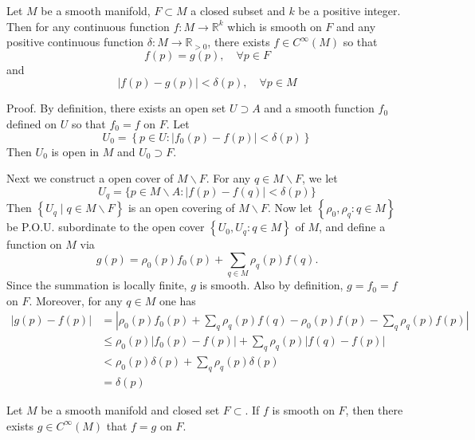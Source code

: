 \documentclass[12pt, oneside]{book}
\begin{document}
\begin{theorem}
    Let $M$ be a smooth manifold, $F \subset M$ a closed subset and $k$ be a positive integer.
    Then for any continuous function $f: M \rightarrow \mathbb{R}^k$ which is smooth on $F$ and any positive continuous function $\delta: M \rightarrow \mathbb{R}_{>0}$, there exists $f \in C^{\infty}(M)$ so that
    \begin{equation*}
        f(p)=g(p), \quad \forall p \in F
    \end{equation*}
    and
    \begin{equation*}
        |f(p)-g(p)|<\delta(p), \quad \forall p \in M
    \end{equation*}

    Proof.
    By definition, there exists an open set $U \supset A$ and a smooth function $f_0$ defined on $U$ so that $f_0=f$ on $F$. Let
    \begin{equation*}
        U_0
        =
        \left\{p \in U:\left|f_0(p)-f(p)\right|<\delta(p)\right\}
    \end{equation*}
    Then $U_0$ is open in $M$ and $U_0 \supset F$.


    Next we construct a open cover of $M \backslash F$.
    For any $q \in M \backslash F$, we let
    \begin{equation*}
        U_q
        =
        \{p \in M \backslash A:|f(p)-f(q)|<\delta(p)\}
    \end{equation*}
    Then $\left\{U_q \mid q \in M \backslash F\right\}$ is an open covering of $M \backslash F$.
    Now let $\left\{\rho_0, \rho_q: q \in M\right\}$ be P.O.U. subordinate to the open cover $\left\{U_0, U_q: q \in M\right\}$ of $M$, and define a function on $M$ via
    \begin{equation*}
        g(p)
        =
        \rho_0(p) f_0(p)+\sum_{q \in M} \rho_q(p) f(q) .
    \end{equation*}
    Since the summation is locally finite, $g$ is smooth. Also by definition, $g=f_0=f$ on $F$. Moreover, for any $q \in M$ one has
    \begin{equation*}
        \begin{aligned}
            \left| g(p)-f(p)\right| & =\left|\rho_0(p) f_0(p)+\sum_q \rho_q(p) f(q)-\rho_0(p) f(p)-\sum_q \rho_q(p) f(p)\right| \\
                                    & \leq \rho_0(p)\left|f_0(p)-f(p)\right|+\sum_q \rho_q(p)|f(q)-f(p)|                        \\
                                    & <\rho_0(p) \delta(p)+\sum_q \rho_q(p) \delta(p)                                           \\
                                    & =\delta(p)
        \end{aligned}
    \end{equation*}
\end{theorem}
\begin{corollary}[Tietze]
    Let $M$ be a smooth manifold and closed set $F \subset$. If $f$ is smooth on $F$, then there exists $g \in C^\infty\left(M\right)$ that $f=g$ on $F$.
\end{corollary}
\end{document}
